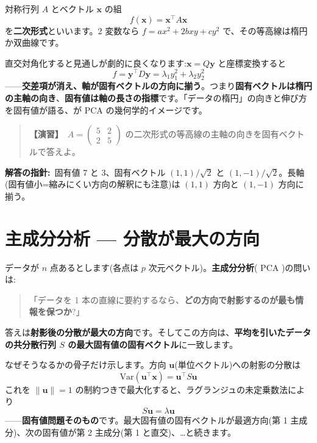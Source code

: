 \documentclass{article}
\begin{document}
対称行列 \(A\) とベクトル \(\boldsymbol{x}\) の組
\[ f(\boldsymbol{x}) = \boldsymbol{x}^{\top} A \boldsymbol{x} \]
を\textbf{二次形式}といいます。2 変数なら \(f = ax^2 + 2bxy + cy^2\) で、その等高線は楕円か双曲線です。

直交対角化すると見通しが劇的に良くなります:\(\boldsymbol{x} = Q\boldsymbol{y}\) と座標変換すると
\[ f = \boldsymbol{y}^{\top} D \boldsymbol{y} = \lambda_1 y_1^2 + \lambda_2 y_2^2 \]
——\textbf{交差項が消え、軸が固有ベクトルの方向に揃う}。つまり\textbf{固有ベクトルは楕円の主軸の向き}、\textbf{固有値は軸の長さの指標}です。「データの楕円」の向きと伸び方を固有値が語る、が PCA の幾何学的イメージです。

\begin{quote}
\textbf{【演習】}\ \(A = \begin{pmatrix} 5 & 2 \\ 2 & 5 \end{pmatrix}\) の二次形式の等高線の主軸の向きを固有ベクトルで答えよ。
\end{quote}

\textbf{解答の指針:}\ 固有値 7 と 3、固有ベクトル \((1,1)/\sqrt{2}\) と \((1,-1)/\sqrt{2}\)。長軸(固有値小=縮みにくい方向の解釈にも注意)は \((1,1)\) 方向と \((1,-1)\) 方向に揃う。

\section{主成分分析 — 分散が最大の方向}

データが \(n\) 点あるとします(各点は \(p\) 次元ベクトル)。\textbf{主成分分析}( PCA )の問いは:

\begin{quote}
「データを 1 本の直線に要約するなら、\textbf{どの方向で射影するのが最も情報を保つか}?」
\end{quote}

答えは\textbf{射影後の分散が最大の方向}です。そしてこの方向は、\textbf{平均を引いたデータの共分散行列 \(S\) の最大固有値の固有ベクトル}に一致します。

なぜそうなるかの骨子だけ示します。方向 \(\boldsymbol{u}\)(単位ベクトル)への射影の分散は
\[ \mathrm{Var}(\boldsymbol{u}^{\top}\boldsymbol{x}) = \boldsymbol{u}^{\top} S \boldsymbol{u} \]
これを \(\|\boldsymbol{u}\| = 1\) の制約つきで最大化すると、ラグランジュの未定乗数法により
\[ S\boldsymbol{u} = \lambda \boldsymbol{u} \]
——\textbf{固有値問題そのもの}です。最大固有値の固有ベクトルが最適方向(第 1 主成分)、次の固有値が第 2 主成分(第 1 と直交)、…と続きます。
\end{document}
